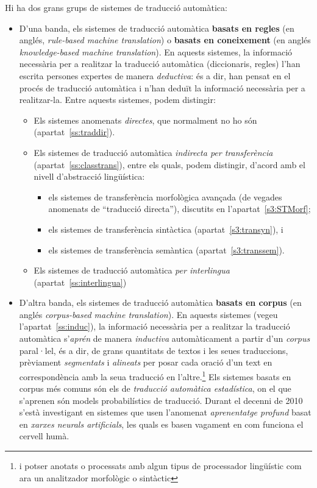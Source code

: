 Hi ha dos grans grups de sistemes de traducció automàtica:
\begin{itemize}
\item D'una banda, els sistemes de traducció automàtica \textbf{basats
    en regles} (en anglés, \emph{rule-based machine translation}) o
  \textbf{basats en coneixement} (en anglés \emph{knowledge-based
    machine translation}). En aquests sistemes, la informació
  necessària per a realitzar la traducció automàtica (diccionaris,
  regles) l'han escrita persones expertes de manera \emph{deductiva}:
  és a dir, han pensat en el procés de traducció automàtica i n'han
  deduït la informació necessària per a realitzar-la. Entre aquests
  sistemes, podem distingir:
  \begin{itemize}
  \item Els sistemes anomenats \emph{directes}, que normalment no ho
    són (apartat~\ref{ss:traddir}).
  \item Els sistemes de traducció automàtica \emph{indirecta per
      transferència} (apartat~\ref{ss:classtrans}), entre els quals, podem distingir, d'acord amb el
    nivell d'abstracció lingüística:
    \begin{itemize}
    \item els sistemes de transferència morfològica avançada (de
      vegades anomenats de ``traducció directa''), discutits en l'apartat~\ref{s3:STMorf};
    \item els sistemes de transferència sintàctica (apartat~\ref{s3:transyn}), i
    \item els sistemes de transferència semàntica
      (apartat~\ref{s3:transsem}).
    \end{itemize}
  \item Els sistemes de traducció automàtica \emph{per interlingua}
    (apartat~\ref{ss:interlingua})
  \end{itemize}
\item D'altra banda, els sistemes de traducció automàtica
  \textbf{basats en corpus} (en anglés \emph{corpus-based machine
    translation}). En aquests sistemes (vegeu
  l'apartat~\ref{ss:induc}), la informació necessària per a realitzar
  la traducció automàtica s'\emph{aprén} de manera \emph{inductiva}
  automàticament a partir d'un \emph{corpus} paral·lel, és a dir, de
  grans quantitats de textos i les seues traduccions, prèviament
  \emph{segmentats} i \emph{alineats} per posar cada oració d'un text
  en correspondència amb la seua traducció en l'altre.\footnote{i
    potser anotats o processats amb algun tipus de processador
    lingüístic com ara un analitzador morfològic o sintàctic} Els
  sistemes basats en corpus més comuns són els de \emph{traducció
    automàtica estadística}, on el que s'aprenen són models
  probabilístics de traducció. Durant el decenni de 2010 s'està
  investigant en sistemes que usen l'anomenat \emph{aprenentatge
    profund} basat en \emph{xarxes neurals artificials}, les quals es
  basen vagament en com funciona el cervell humà. 
\end{itemize}
 
